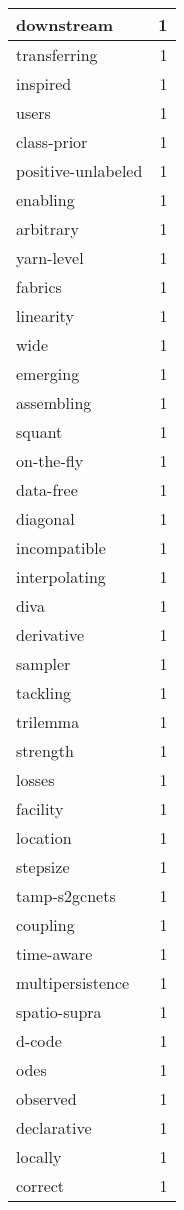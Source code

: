 \begin{table}[h]
\begin{tabular}{|l|r|}
\hline
downstream & 1 \\
\hline
transferring & 1 \\
\hline
inspired & 1 \\
\hline
users & 1 \\
\hline
class-prior & 1 \\
\hline
positive-unlabeled & 1 \\
\hline
enabling & 1 \\
\hline
arbitrary & 1 \\
\hline
yarn-level & 1 \\
\hline
fabrics & 1 \\
\hline
linearity & 1 \\
\hline
wide & 1 \\
\hline
emerging & 1 \\
\hline
assembling & 1 \\
\hline
squant & 1 \\
\hline
on-the-fly & 1 \\
\hline
data-free & 1 \\
\hline
diagonal & 1 \\
\hline
incompatible & 1 \\
\hline
interpolating & 1 \\
\hline
diva & 1 \\
\hline
derivative & 1 \\
\hline
sampler & 1 \\
\hline
tackling & 1 \\
\hline
trilemma & 1 \\
\hline
strength & 1 \\
\hline
losses & 1 \\
\hline
facility & 1 \\
\hline
location & 1 \\
\hline
stepsize & 1 \\
\hline
tamp-s2gcnets & 1 \\
\hline
coupling & 1 \\
\hline
time-aware & 1 \\
\hline
multipersistence & 1 \\
\hline
spatio-supra & 1 \\
\hline
d-code & 1 \\
\hline
odes & 1 \\
\hline
observed & 1 \\
\hline
declarative & 1 \\
\hline
locally & 1 \\
\hline
correct & 1 \\

\end{tabular}
\end{table}
